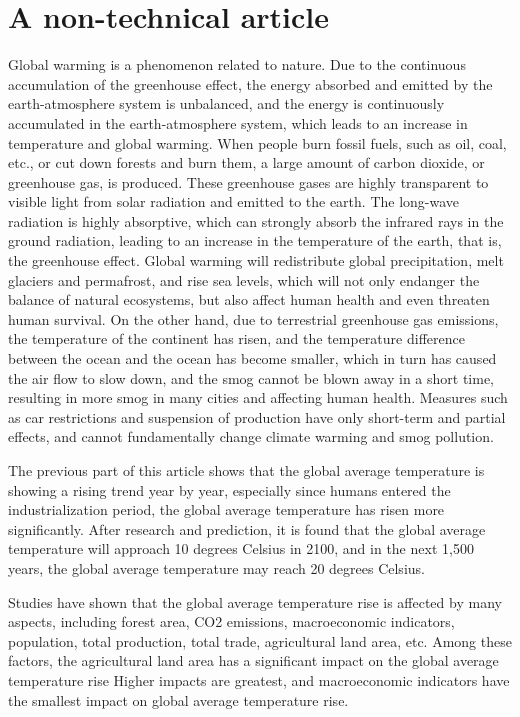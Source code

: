 \documentclass{apmcmthesis}
\begin{document}
  \section{A non-technical article}
  Global warming is a phenomenon related to nature. Due to the continuous accumulation of the greenhouse effect, the energy absorbed and emitted by the earth-atmosphere system is unbalanced, and the energy is continuously accumulated in the earth-atmosphere system, which leads to an increase in temperature and global warming. When people burn fossil fuels, such as oil, coal, etc., or cut down forests and burn them, a large amount of carbon dioxide, or greenhouse gas, is produced. These greenhouse gases are highly transparent to visible light from solar radiation and emitted to the earth. The long-wave radiation is highly absorptive, which can strongly absorb the infrared rays in the ground radiation, leading to an increase in the temperature of the earth, that is, the greenhouse effect. Global warming will redistribute global precipitation, melt glaciers and permafrost, and rise sea levels, which will not only endanger the balance of natural ecosystems, but also affect human health and even threaten human survival. On the other hand, due to terrestrial greenhouse gas emissions, the temperature of the continent has risen, and the temperature difference between the ocean and the ocean has become smaller, which in turn has caused the air flow to slow down, and the smog cannot be blown away in a short time, resulting in more smog in many cities and affecting human health. Measures such as car restrictions and suspension of production have only short-term and partial effects, and cannot fundamentally change climate warming and smog pollution.
  
  The previous part of this article shows that the global average temperature is showing a rising trend year by year, especially since humans entered the industrialization period, the global average temperature has risen more significantly. After research and prediction, it is found that the global average temperature will approach 10 degrees Celsius in 2100, and in the next 1,500 years, the global average temperature may reach 20 degrees Celsius.
  
  Studies have shown that the global average temperature rise is affected by many aspects, including forest area, CO2 emissions, macroeconomic indicators, population, total production, total trade, agricultural land area, etc. Among these factors, the agricultural land area has a significant impact on the global average temperature rise Higher impacts are greatest, and macroeconomic indicators have the smallest impact on global average temperature rise.
  
\end{document}
